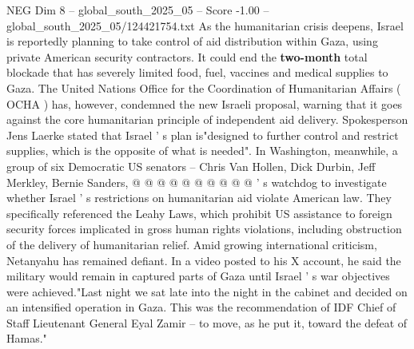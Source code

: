 \begin{textsample}{NEG Dim 8 – global\_south\_2025\_05 – Score -1.00 – global\_south\_2025\_05/124421754.txt}
As the humanitarian crisis deepens, Israel is reportedly planning to take control of aid distribution within Gaza, using private American security contractors.
It could end the \textbf{two-month} total blockade that has severely limited food, fuel, vaccines and medical supplies to Gaza.
The United Nations Office for the Coordination of Humanitarian Affairs ( OCHA ) has, however, condemned the new Israeli proposal, warning that it goes against the core humanitarian principle of independent aid delivery.
Spokesperson Jens Laerke stated that Israel ' s plan is"designed to further control and restrict supplies, which is the opposite of what is needed".
In Washington, meanwhile, a group of six Democratic US senators -- Chris Van Hollen, Dick Durbin, Jeff Merkley, Bernie Sanders, @ @ @ @ @ @ @ @ @ @ ' s watchdog to investigate whether Israel ' s restrictions on humanitarian aid violate American law.
They specifically referenced the Leahy Laws, which prohibit US assistance to foreign security forces implicated in gross human rights violations, including obstruction of the delivery of humanitarian relief.
Amid growing international criticism, Netanyahu has remained defiant.
In a video posted to his X account, he said the military would remain in captured parts of Gaza until Israel ' s war objectives were achieved."Last night we sat late into the night in the cabinet and decided on an intensified operation in Gaza.
This was the recommendation of IDF Chief of Staff Lieutenant General Eyal Zamir -- to move, as he put it, toward the defeat of Hamas."

\end{textsample}
